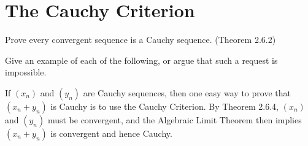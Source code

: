 \section{The Cauchy Criterion}

\begin{exercise}
  Prove every convergent sequence is a Cauchy sequence. (Theorem 2.6.2)
\end{exercise}

\begin{solution}
  \TODO
\end{solution}

\begin{exercise}
  Give an example of each of the following, or argue that such a request is impossible.
\end{exercise}

\begin{solution}
  \enum{
  \item \TODO
  \item \TODO
  \item \TODO
  \item \TODO
  }
\end{solution}

\begin{exercise}
  If $\left(x_{n}\right)$ and $\left(y_{n}\right)$ are Cauchy sequences, then one easy way to prove that $\left(x_{n}+y_{n}\right)$ is Cauchy is to use the Cauchy Criterion. By Theorem 2.6.4, $\left(x_{n}\right)$ and $\left(y_{n}\right)$ must be convergent, and the Algebraic Limit Theorem then implies $\left(x_{n}+y_{n}\right)$ is convergent and hence Cauchy.
\end{exercise}

\begin{solution}
  \enum{
  \item \TODO
  \item \TODO
  }
\end{solution}


